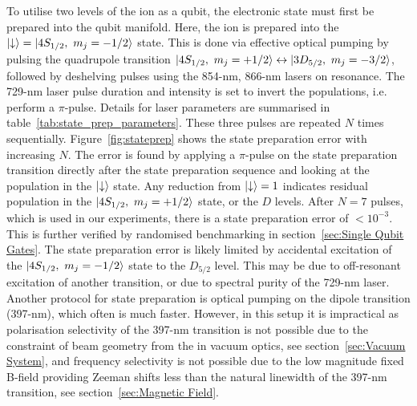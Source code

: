     To utilise two levels of the ion as a qubit, the electronic state must first be prepared into the qubit manifold. Here, the ion is prepared into the $\ket{\downarrow}=\ket{4S_{1/2},~m_j=-1/2}$ state. 
    This is done via effective optical pumping by pulsing the quadrupole transition $\ket{4S_{1/2},~m_j = +1/2} \leftrightarrow \ket{3D_{5/2},~m_j = -3/2}$,
    followed by deshelving pulses using the 854-nm, 866-nm
    lasers on resonance.  The 729-nm laser pulse duration and intensity is set to invert the populations, i.e. perform a $\pi$-pulse. Details for laser parameters are summarised in table~\ref{tab:state_prep_parameters}. These three pulses are repeated $N$ times sequentially. Figure~\ref{fig:stateprep} shows the state preparation error with increasing $N$. The error is found by applying a $\pi$-pulse on the state preparation transition directly after the state preparation sequence and looking at the population in the $\ket{\downarrow}$ state. Any reduction from $\ket{\downarrow} = 1$ indicates residual population in the $\ket{4S_{1/2},~m_j = +1/2}$ state, or the $D$ levels. After $N=7$ pulses, which is used in our experiments, there is a state preparation error of $<10^{-3}$. This is further verified by randomised benchmarking in section~\ref{sec:Single Qubit Gates}. The state preparation error is likely limited by accidental excitation of the $\ket{4S_{1/2},~m_j = -1/2}$ state to the $D_{5/2}$ level. This may be due to off-resonant excitation of another transition, or due to spectral purity of the 729-nm laser. \\
    Another protocol for state preparation is optical pumping on the dipole transition (397-nm), which often is much faster. However, in this setup it is impractical as polarisation selectivity of the 397-nm transition is not possible due to 
    the constraint of beam geometry from the in vacuum optics, see section~\ref{sec:Vacuum System},
    and frequency selectivity is not possible due to the low magnitude fixed B-field providing Zeeman shifts less than the natural linewidth of the 397-nm transition, see section~\ref{sec:Magnetic Field}. 


